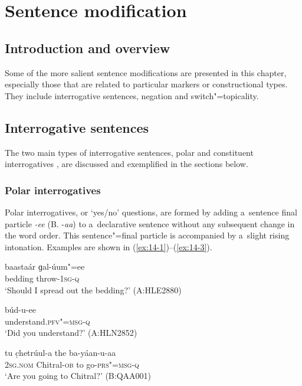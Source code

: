 \chapter{Sentence modification}
\label{chap:14}

\section{Introduction and overview}
\label{sec:14-1}


Some of the more salient sentence modifications are presented in this chapter, especially those that are related to particular markers or constructional types. They include interrogative sentences, negation and switch"=topicality.


\section{Interrogative sentences}
\label{sec:14-2}


The two main types of interrogative sentences, polar and constituent interrogatives \citep[290--303]{koenigsiemund2007}, are discussed and exemplified in the sections below. 


\subsection{Polar interrogatives}
\label{subsec:14-2-1}


Polar interrogatives, or `yes/no' questions, are formed by adding a~sentence final particle \textit{-ee} (B. -\textit{aa}) to a~declarative sentence without any subsequent change in the word order. This sentence"=final particle is accompanied by a~slight rising intonation. Examples are shown in (\ref{ex:14-1})--(\ref{ex:14-3}).

\begin{exe}
\ex
\label{ex:14-1}
\gll baastaár ɡal-úum"=ee  \\
bedding throw-\textsc{1sg-q} \\
\glt `Should I spread out the bedding?' (A:HLE2880)

\ex
\label{ex:14-2}
\gll búd-u-ee \\
understand.\textsc{pfv"=msg-q} \\
\glt `Did you understand?' (A:HLN2852)

\ex
\label{ex:14-3}
\gll tu c̣hetrúul-a the ba-yáan-u-aa \\
\textsc{2sg.nom} Chitral-\textsc{ob} to go-\textsc{prs"=msg-q} \\
\glt `Are you going to Chitral?' (B:QAA001)
\end{exe}

